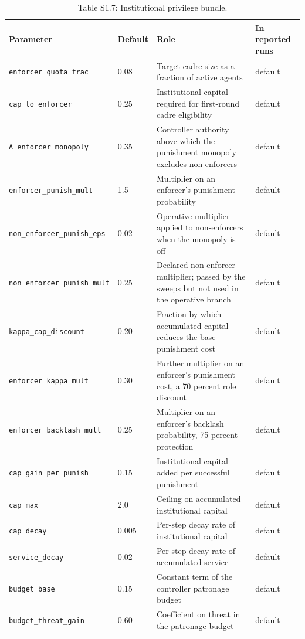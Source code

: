 \documentclass[12pt]{article}
\begin{document}
\begin{table}[htbp]
\centering
\footnotesize
\caption{Table S1.7: Institutional privilege bundle.}
\begin{tabular}{p{4.9cm}p{1.3cm}p{4.5cm}p{2.4cm}}
\toprule
Parameter & Default & Role & In reported runs \\
\midrule
\texttt{enforcer\_quota\_frac} & 0.08 & Target cadre size as a fraction of active agents & default \\
\texttt{cap\_to\_enforcer} & 0.25 & Institutional capital required for first-round cadre eligibility & default \\
\texttt{A\_enforcer\_monopoly} & 0.35 & Controller authority above which the punishment monopoly excludes non-enforcers & default \\
\texttt{enforcer\_punish\_mult} & 1.5 & Multiplier on an enforcer's punishment probability & default \\
\texttt{non\_enforcer\_punish\_eps} & 0.02 & Operative multiplier applied to non-enforcers when the monopoly is off & default \\
\texttt{non\_enforcer\_punish\_mult} & 0.25 & Declared non-enforcer multiplier; passed by the sweeps but not used in the operative branch & default \\
\texttt{kappa\_cap\_discount} & 0.20 & Fraction by which accumulated capital reduces the base punishment cost & default \\
\texttt{enforcer\_kappa\_mult} & 0.30 & Further multiplier on an enforcer's punishment cost, a 70 percent role discount & default \\
\texttt{enforcer\_backlash\_mult} & 0.25 & Multiplier on an enforcer's backlash probability, 75 percent protection & default \\
\texttt{cap\_gain\_per\_punish} & 0.15 & Institutional capital added per successful punishment & default \\
\texttt{cap\_max} & 2.0 & Ceiling on accumulated institutional capital & default \\
\texttt{cap\_decay} & 0.005 & Per-step decay rate of institutional capital & default \\
\texttt{service\_decay} & 0.02 & Per-step decay rate of accumulated service & default \\
\texttt{budget\_base} & 0.15 & Constant term of the controller patronage budget & default \\
\texttt{budget\_threat\_gain} & 0.60 & Coefficient on threat in the patronage budget & default \\
\bottomrule
\end{tabular}
\end{table}
\end{document}
